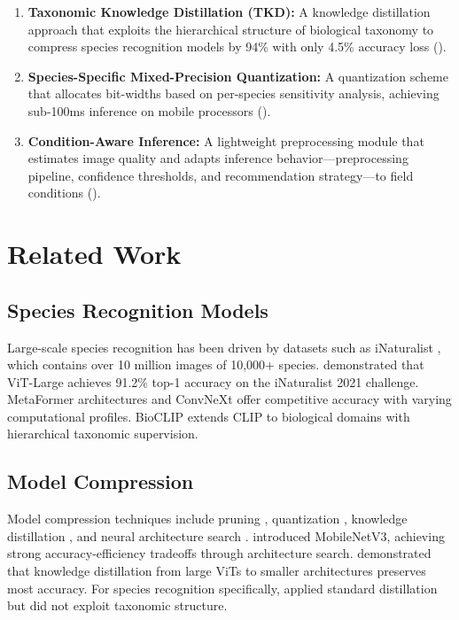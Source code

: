 \documentclass[11pt,a4paper]{article}
\begin{document}
\begin{enumerate}[leftmargin=*]
    \item \textbf{Taxonomic Knowledge Distillation (TKD):} A knowledge distillation approach that exploits the hierarchical structure of biological taxonomy to compress species recognition models by 94\% with only 4.5\% accuracy loss ().
    \item \textbf{Species-Specific Mixed-Precision Quantization:} A quantization scheme that allocates bit-widths based on per-species sensitivity analysis, achieving sub-100ms inference on mobile processors ().
    \item \textbf{Condition-Aware Inference:} A lightweight preprocessing module that estimates image quality and adapts inference behavior---preprocessing pipeline, confidence thresholds, and recommendation strategy---to field conditions ().
\end{enumerate}

\section{Related Work}
\label{sec:related}

\subsection{Species Recognition Models}

Large-scale species recognition has been driven by datasets such as iNaturalist \citep{vanhorn2018inaturalist}, which contains over 10 million images of 10,000+ species.
\citet{vanhorn2021benchmarking} demonstrated that ViT-Large achieves 91.2\% top-1 accuracy on the iNaturalist 2021 challenge.
MetaFormer architectures \citep{yu2022metaformer} and ConvNeXt \citep{liu2022convnet} offer competitive accuracy with varying computational profiles.
BioCLIP \citep{stevens2024bioclip} extends CLIP to biological domains with hierarchical taxonomic supervision.

\subsection{Model Compression}

Model compression techniques include pruning \citep{han2015learning}, quantization \citep{jacob2018quantization}, knowledge distillation \citep{hinton2015distilling}, and neural architecture search \citep{tan2019efficientnet}.
\citet{howard2019searching} introduced MobileNetV3, achieving strong accuracy-efficiency tradeoffs through architecture search.
\citet{touvron2021training} demonstrated that knowledge distillation from large ViTs to smaller architectures preserves most accuracy.
For species recognition specifically, \citet{picek2022overcoming} applied standard distillation but did not exploit taxonomic structure.
\end{document}
